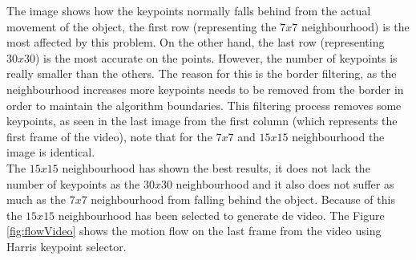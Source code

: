 \documentclass[12pt,a4paper]{article}
\begin{document}
The image shows how the keypoints normally falls behind from the actual movement of the object, the first row (representing the $7x7$ neighbourhood) is the most affected by this problem. On the other hand, the last row (representing $30x30$) is the most accurate on the points. However, the number of keypoints is really smaller than the others. The reason for this is the border filtering, as the neighbourhood increases more keypoints needs to be removed from the border in order to maintain the algorithm boundaries. This filtering process removes some keypoints, as seen in the last image from the first column (which represents the first frame of the video), note that for the $7x7$ and $15x15$ neighbourhood the image is identical. \\

The $15x15$ neighbourhood has shown the best results, it does not lack the number of keypoints as the $30x30$ neighbourhood and it also does not suffer as much as the $7x7$ neighbourhood from falling behind the object. Because of this the $15x15$ neighbourhood has been selected to generate de video. The Figure \ref{fig:flowVideo} shows the motion flow on the last frame from the video using Harris keypoint selector. \\
\end{document}
